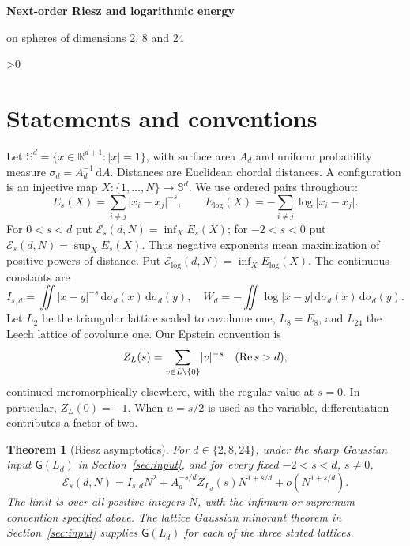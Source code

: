 \documentclass[11pt,a4paper]{article}
\newtheorem{theorem}{Theorem}[section]
\theoremstyle{definition}
\newcommand{\R}{\mathbb R}
\newcommand{\Sph}{\mathbb S}
\newcommand{\cE}{\mathcal E}
\newcommand{\dd}{\,\mathrm d}
\newcommand{\abs}[1]{\lvert#1\rvert}
\newcommand{\G}{\mathsf G}
\numberwithin{equation}{section}
\let\originalsection\section
\renewcommand{\section}{\ifnum\value{section}>0\clearpage\fi\originalsection}
\begin{document}
\begin{center}
{\LARGE\bfseries Next-order Riesz and logarithmic energy\par on spheres of dimensions 2, 8 and 24}\par\vspace{10pt}
\end{center}

\section{Statements and conventions}
Let $\Sph^d=\{x\in\R^{d+1}:\abs{x}=1\}$, with surface area $A_d$ and uniform probability measure $\sigma_d=A_d^{-1}\dd A$. Distances are Euclidean chordal distances. A configuration is an injective map $X:\{1,\ldots,N\}\to\Sph^d$. We use ordered pairs throughout:
\begin{equation}
 E_s(X)=\sum_{i\ne j}\abs{x_i-x_j}^{-s},\qquad
 E_{\log}(X)=-\sum_{i\ne j}\log\abs{x_i-x_j}.
\end{equation}
For $0<s<d$ put $\cE_s(d,N)=\inf_X E_s(X)$; for $-2<s<0$ put $\cE_s(d,N)=\sup_X E_s(X)$. Thus negative exponents mean maximization of positive powers of distance. Put $\cE_{\log}(d,N)=\inf_X E_{\log}(X)$. The continuous constants are
\begin{equation}
 I_{s,d}=\iint\abs{x-y}^{-s}\dd\sigma_d(x)\dd\sigma_d(y),\quad
 W_d=-\iint\log\abs{x-y}\dd\sigma_d(x)\dd\sigma_d(y).
\end{equation}
Let $L_2$ be the triangular lattice scaled to covolume one, $L_8=E_8$, and $L_{24}$ the Leech lattice of covolume one. Our Epstein convention is
\begin{equation}\label{eq:epstein-convention}
 Z_L(s)=\sum_{v\in L\setminus\{0\}}\abs v^{-s}\quad(\mathop{\rm Re}s>d),
\end{equation}
continued meromorphically elsewhere, with the regular value at $s=0$. In particular, $Z_L(0)=-1$. When $u=s/2$ is used as the variable, differentiation contributes a factor of two.

\begin{theorem}[Riesz asymptotics]\label{thm:riesz}
For $d\in\{2,8,24\}$, under the sharp Gaussian input $\G(L_d)$ in Section~\ref{sec:input}, and for every fixed $-2<s<d$, $s\ne0$,
\begin{equation}\label{eq:main}
 \cE_s(d,N)=I_{s,d}N^2+A_d^{-s/d}Z_{L_d}(s)N^{1+s/d}
                  +o(N^{1+s/d}).
\end{equation}
The limit is over all positive integers $N$, with the infimum or supremum convention specified above. The lattice Gaussian minorant theorem in Section~\ref{sec:input} supplies $\G(L_d)$ for each of the three stated lattices.
\end{theorem}
\end{document}
